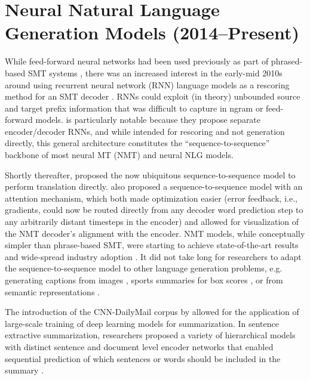 \section{Neural Natural Language Generation Models (2014--Present)}
  
While feed-forward neural networks had been used previously as part of
phrased-based SMT systems \citep{schwenk2006}, there was an increased interest
in the early-mid 2010s around using recurrent neural network (RNN) language
models \citep{mikolov2010} as a rescoring method for an SMT decoder
\citep{auli2013joint,cho2014learning}.  RNNs could exploit (in theory)
unbounded source and target prefix information that was difficult to capture
in ngram or feed-forward models. \citet{cho2014learning} is particularly
notable because they propose separate encoder/decoder RNNs, and while intended
for rescoring and not generation directly, this general architecture
constitutes the ``sequence-to-sequence'' backbone of most neural MT (NMT) and
neural NLG models.
  
Shortly thereafter, \citet{sutskever2014sequence} proposed the now ubiquitous
sequence-to-sequence model to perform translation directly.
\citet{bahdanau2015}  also proposed a sequence-to-sequence model with an
attention mechanism, which both made optimization easier (error feedback,
i.e., gradients, could now be routed directly from any decoder word prediction
step to any arbitrarily  distant timesteps in the encoder) and allowed for
visualization of the NMT decoder's alignment with the encoder.  NMT models,
while conceptually simpler than phrase-based SMT, were starting to achieve
state-of-the-art results \citep{bojar2016} and wide-spread industry adoption
\citep{wu2016google,gehring2017}.  It did not take long for researchers to
adapt the sequence-to-sequence model to other language generation problems,
e.g. generating captions from images \citep{vinyals2015a}, sports summaries
for box scores \cite{lebret2016,wiseman2017}, or from semantic representations
\citep{wen2015,dusek2016}. 
  
The introduction of the CNN-DailyMail corpus by \cite{hermann2015} allowed for
the application of large-scale training of deep learning models for
summarization. In sentence extractive summarization, researchers proposed a
variety of hierarchical models with distinct sentence and document level
encoder networks that enabled sequential prediction of which sentences or
words should be included in the summary
\citep{cheng2016neural,nallapati2017summarunner}.

